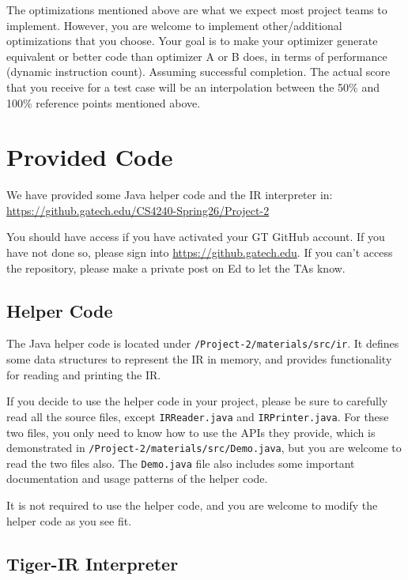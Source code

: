 \documentclass[12pt]{article}
\begin{document}
The optimizations mentioned above are what we expect most project
teams to implement.  However, you are welcome to implement other/additional
optimizations that you choose.  
Your goal is to make your optimizer generate equivalent or better code than
optimizer A or B does,
in terms of performance (dynamic instruction count).  Assuming
successful completion.  The actual score
that you receive for a test case will be an interpolation between the
50\% and 100\% reference points mentioned above.

\section{Provided Code}\label{sec:code}

We have provided some Java helper code and the IR interpreter in:\\
\url{https://github.gatech.edu/CS4240-Spring26/Project-2}

You should have access if you have activated your GT GitHub account.
If you have not done so, please sign into \url{https://github.gatech.edu}. 
If you can't access the repository, please make a private post on Ed to let the TAs know.

\subsection{Helper Code}

The Java helper code is located under \texttt{/Project-2/materials/src/ir}.
It defines some data structures to represent the IR in memory,
and provides functionality for reading and printing the IR.

If you decide to use the helper code in your project, please be sure
to carefully read all the source files, except \texttt{IRReader.java} and \texttt{IRPrinter.java}.
For these two files, you only need to know how to use the APIs they provide,
which is demonstrated in \texttt{/Project-2/materials/src/Demo.java}, but you are
welcome to read the two files also.
The \texttt{Demo.java} file also includes some important documentation and usage patterns of the helper code.

It is not required to use the helper code, and you are welcome to
modify the helper code as you see fit.

\subsection{Tiger-IR Interpreter}
\end{document}

